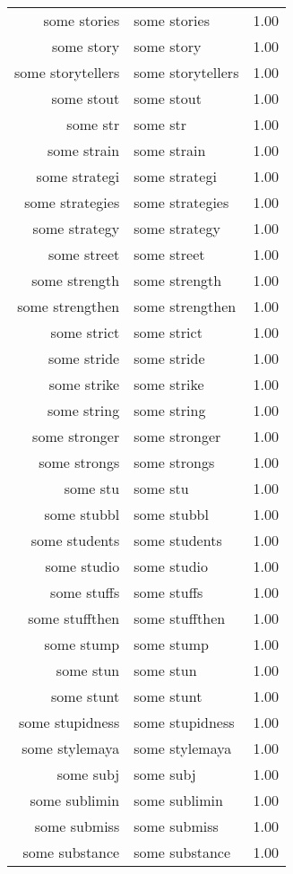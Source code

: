 \begin{table}[ht]
\begin{tabular}{rlr}
  some stories & some stories & 1.00 \\ 
  some story & some story & 1.00 \\ 
  some storytellers & some storytellers & 1.00 \\ 
  some stout & some stout & 1.00 \\ 
  some str & some str & 1.00 \\ 
  some strain & some strain & 1.00 \\ 
  some strategi & some strategi & 1.00 \\ 
  some strategies & some strategies & 1.00 \\ 
  some strategy & some strategy & 1.00 \\ 
  some street & some street & 1.00 \\ 
  some strength & some strength & 1.00 \\ 
  some strengthen & some strengthen & 1.00 \\ 
  some strict & some strict & 1.00 \\ 
  some stride & some stride & 1.00 \\ 
  some strike & some strike & 1.00 \\ 
  some string & some string & 1.00 \\ 
  some stronger & some stronger & 1.00 \\ 
  some strongs & some strongs & 1.00 \\ 
  some stu & some stu & 1.00 \\ 
  some stubbl & some stubbl & 1.00 \\ 
  some students & some students & 1.00 \\ 
  some studio & some studio & 1.00 \\ 
  some stuffs & some stuffs & 1.00 \\ 
  some stuffthen & some stuffthen & 1.00 \\ 
  some stump & some stump & 1.00 \\ 
  some stun & some stun & 1.00 \\ 
  some stunt & some stunt & 1.00 \\ 
  some stupidness & some stupidness & 1.00 \\ 
  some stylemaya & some stylemaya & 1.00 \\ 
  some subj & some subj & 1.00 \\ 
  some sublimin & some sublimin & 1.00 \\ 
  some submiss & some submiss & 1.00 \\ 
  some substance & some substance & 1.00 \\ 

\end{tabular}
\end{table}
